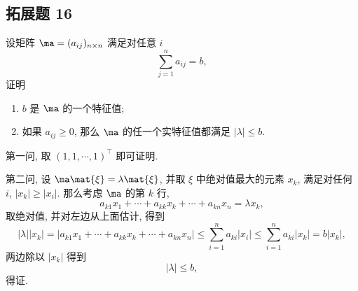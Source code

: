\newpage
\subsection*{ 拓展题 16 }
\begin{problem*}
设矩阵 $\ma = (a_{ij})_{n \times n}$ 满足对任意 $i$
\[
\sum_{j = 1}^{n} a_{ij} = b,
\]
证明
\begin{enumerate}
    \item $b$ 是 $\ma$ 的一个特征值;
    \item 如果 $a_{ij} \geqslant 0$, 那么 $\ma$ 的任一个实特征值都满足 $|\lambda| \leqslant b$.
\end{enumerate}
\end{problem*}
\begin{solution}
第一问, 取 $(1, 1, \cdots, 1)^\top$ 即可证明.

第二问, 设 $\ma \mat{\xi} = \lambda \mat{\xi}$, 并取 $\xi$ 中绝对值最大的元素 $x_k$, 满足对任何 $i$, $|x_k| \geqslant |x_i|$. 那么考虑 $\ma$ 的第 $k$ 行,
\[
a_{k1} x_1 + \cdots + a_{kk} x_k + \cdots + a_{kn} x_n = \lambda x_k,
\]
取绝对值, 并对左边从上面估计, 得到
\[
|\lambda| |x_k| = |a_{k1} x_1 + \cdots + a_{kk} x_k + \cdots + a_{kn} x_n| \leqslant \sum_{i = 1}^{n} a_{ki} |x_i| \leqslant \sum_{i = 1}^{n} a_{ki} |x_k| = b |x_k|,
\]
两边除以 $|x_k|$ 得到
\[
|\lambda | \leqslant b,
\]
得证.
\end{solution}